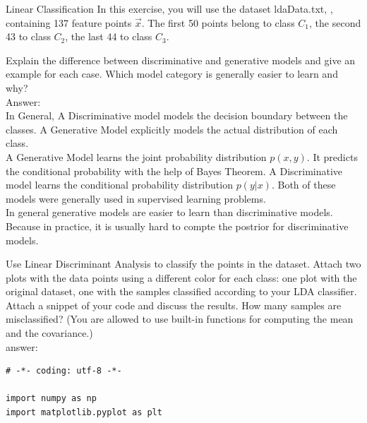 \documentclass[
	ngerman,
     solution=true
	]{tudaexercise}
\begin{document}
\begin{task}{Linear Classification}
In this exercise, you will use the dataset ldaData.txt, , containing 137 feature points $\vec{x}$. The first 50 points belong to
class $C_1$, the second 43 to class $C_2$, the last 44 to class $C_3$.
\begin{subtask}[2a)]
Explain the difference between discriminative and generative models and give an example for each case. Which model
category is generally easier to learn and why?\\
Answer:\\[15pt]
In General, A Discriminative model ‌models the decision boundary between the classes. A Generative Model ‌explicitly models the actual distribution of each class. \\[15pt]
A Generative Model ‌learns the joint probability distribution $p(x,y)$. It predicts the conditional probability with the help of Bayes Theorem. A Discriminative model ‌learns the conditional probability distribution $p(y|x)$. Both of these models were generally used in supervised learning problems.\\[15pt]
In general generative models are easier to learn than discriminative models. Because in practice, it  is usually
hard to compte the postrior for discriminative models.

\end{subtask}
\newpage
\begin{subtask}[2b)]
Use Linear Discriminant Analysis to classify the points in the dataset. Attach two plots with the data points using a
different color for each class: one plot with the original dataset, one with the samples classified according to your LDA
classifier. Attach a snippet of your code and discuss the results. How many samples are misclassified? (You are allowed
to use built-in functions for computing the mean and the covariance.)
\\[15pt]
answer:\\[15pt]
\begin{lstlisting}
# -*- coding: utf-8 -*-

import numpy as np
import matplotlib.pyplot as plt


\end{lstlisting}
\end{subtask}
\end{task}
\end{document}
